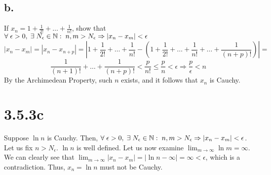 \documentclass[11pt]{article}
\begin{document}
\subsection*{b.}
If $x_n = 1 + \frac{1}{2!} + \ldots + \frac{1}{n!}$, show that $\forall \hspace{1mm} \epsilon > 0, \hspace{1mm} \exists \hspace{1mm} N_{\epsilon} \in \mathbb{N}: \hspace{1mm} n,m>N_{\epsilon} \Rightarrow |x_n-x_m| < \epsilon$
\[|x_n-x_m|=|x_n-x_{n+p}|=\left|1+\frac{1}{2!}+\ldots+\frac{1}{n!}-\left(1+\frac{1}{2!}+\ldots+\frac{1}{n!}+\ldots+\frac{1}{(n+p)!}\right)\right|=\]
\[\frac{1}{(n+1)!}+\ldots+\frac{1}{(n+p)!} < \frac{p}{n!} \leq \frac{p}{n}<\epsilon\Rightarrow\frac{p}{\epsilon} < n\]
By the Archimedean Property, such $n$ exists, and it follows that $x_n$ is Cauchy.

\section*{3.5.3c}
Suppose $\ln{n}$ is Cauchy. Then, $\forall \hspace{1mm} \epsilon > 0, \hspace{1mm} \exists \hspace{1mm} N_{\epsilon}\in\mathbb{N}:\hspace{1mm} n,m>N_{\epsilon}\Rightarrow |x_n-x_m| < \epsilon$. \\
Let us fix $n>N_{\epsilon}$. $\ln{n}$ is well defined. Let us now examine $\lim_{m\to\infty} \ln{m}=\infty$. We can clearly see that $\lim_{m\to\infty}|x_n-x_m|=|\ln{n}-\infty|=\infty < \epsilon$, which is a contradiction. Thus, $x_n=\ln{n}$ must not be Cauchy.
\end{document}
